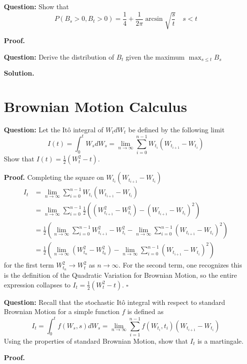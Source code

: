 \documentclass{article}
\begin{document}
\begin{tcolorbox}[colframe=black,colback=gray!5,boxrule=0.5pt]
    \textbf{Question:} Show that 
    $$P(B_s>0,B_t>0) = \frac{1}{4} + \frac{1}{2\pi}\arcsin{\sqrt{\frac{s}{t}}} \quad s<t$$
\end{tcolorbox}
\textbf{Proof.}


\begin{tcolorbox}[colframe=black,colback=gray!5,boxrule=0.5pt]
    \textbf{Question:} Derive the distribution of $B_t$  given the maximum $\max_{s\leq t} B_s$
\end{tcolorbox}
\textbf{Solution.}


\newpage
\section{Brownian Motion Calculus}

\begin{tcolorbox}[colframe=black,colback=gray!5,boxrule=0.5pt]
\textbf{Question:} Let the Itô integral of $W_tdW_t$ be defined by the following limit
$$I(t) = \int_0^tW_sdW_s = \lim_{n\to\infty}\sum_{i=0}^{n-1}W_{t_i}(W_{t_{i+1}} - W_{t_i})$$
Show that $I(t) = \frac{1}{2}(W_t^2-t)$.
\end{tcolorbox}
\textbf{Proof.} Completing the square on $W_{t_i}(W_{t_{i+1}} - W_{t_i})$
\begin{align*}
    I_t &= \lim_{n\to\infty}\sum_{i=0}^{n-1}W_{t_i}(W_{t_{i+1}} - W_{t_i}) \\
    &= \lim_{n\to\infty}\sum_{i=0}^{n-1}\frac{1}{2}((W_{t_{i+1}}^2-W_{t_i}^2) - (W_{t_{i+1}} - W_{t_i})^2) \\
    &= \frac{1}{2}\left(\lim_{n\to\infty}\sum_{i=0}^{n-1}W_{t_{i+1}}^2-W_{t_i}^2 - \lim_{n\to\infty}\sum_{i=0}^{n-1}(W_{t_{i+1}}-W_{t_i})^2\right) \\
    &= \frac{1}{2}\left(\lim_{n\to\infty}(W_{t_n}^2 - W_{t_0}^2) -  \lim_{n\to\infty}\sum_{i=0}^{n-1}(W_{t_{i+1}}-W_{t_i})^2\right)
\end{align*}
for the first term $W_{t_n}^2\to W_t^2$ as $n\to\infty$. For the second term, one recognizes this is the definition of the Quadratic Variation for Brownian Motion, so the entire expression collapses to $I_t = \frac{1}{2}(W_t^2-t)$. $\square$

\begin{tcolorbox}[colframe=black,colback=gray!5,boxrule=0.5pt]
\textbf{Question:} Recall that the stochastic Itô integral with respect to standard Brownian Motion for a simple function $f$ is defined as 
$$I_t = \int_0^t f(W_s,s)dW_s = \lim_{n\to\infty}\sum_{i=1}^{n-1}f(W_{t_i}, t_i)(W_{t_{i+1}} - W_{t_i})$$
Using the properties of standard Brownian Motion, show that $I_t$ is a martingale.
\end{tcolorbox}
\textbf{Proof.}
\end{document}
